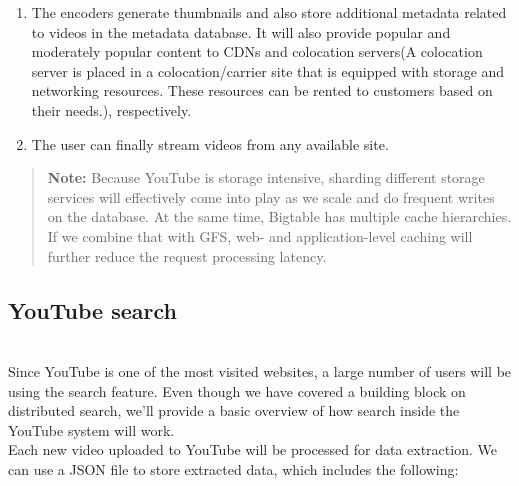 \begin{enumerate}
\begin{enumerate}
\item
Upload storage is used to store user-uploaded videos temporarily before they are encoded.
\item
User account data is stored in a separate database, whereas videos metadata is stored separately. The idea is to separate the more frequently and less frequently accessed storage clusters from each other for optimal access time. We can use MySQL if there are a limited number of concurrent reads and writes. However, as the number of users---and therefore the number of concurrent reads and writes---grows, we can move towards NoSQL types of data management systems.
\item
Since Bigtable is based on Google File System (GFS), it is designed to store a large number of small files with low retrieval latency. It is a reasonable choice for storing thumbnails.
\end{enumerate}
\item
\protect{}\label{p98FnCt-Boq1PHJfitV2W}
The encoders generate thumbnails and also store additional metadata related to videos in the metadata database. It will also provide popular and moderately popular content to CDNs and colocation servers(A colocation server is placed in a colocation/carrier site that is equipped with storage and networking resources. These resources can be rented to customers based on their needs.), respectively.
\item
\protect{}\label{C9YMFFq6y2SpoLlCNA9Cj}
The user can finally stream videos from any available site.
\end{enumerate}
\begin{quote}
\textbf{Note:} Because YouTube is storage intensive, sharding different storage services will effectively come into play as we scale and do frequent writes on the database. At the same time, Bigtable has multiple cache hierarchies. If we combine that with GFS, web- and application-level caching will further reduce the request processing latency.
\end{quote}
\subsection{YouTube search}\label{FdehoMmu2U4Kf6lbLTkJS}
\\
Since YouTube is one of the most visited websites, a large number of users will be using the search feature. Even though we have covered a building block on distributed search, we'll provide a basic overview of how search inside the YouTube system will work.
\\
Each new video uploaded to YouTube will be processed for data extraction. We can use a JSON file to store extracted data, which includes the following:

